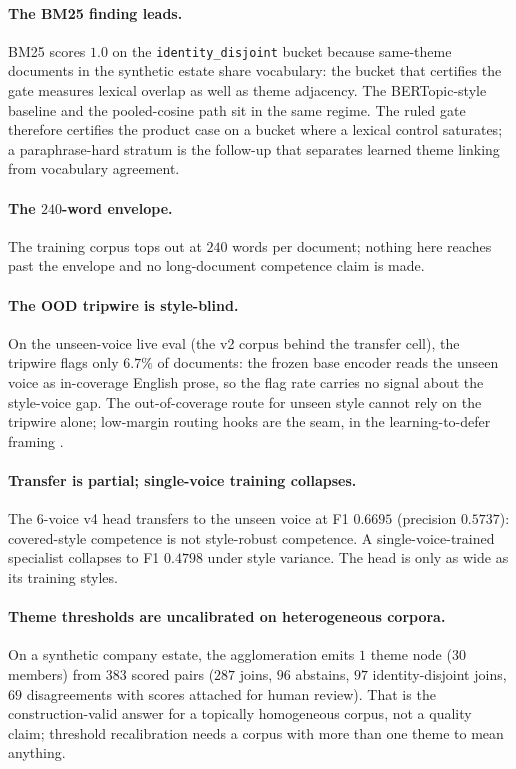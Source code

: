 \documentclass{article}
\begin{document}
\paragraph{The BM25 finding leads.}
BM25 scores $1.0$ on the \texttt{identity\_disjoint} bucket because same-theme documents in the synthetic estate share vocabulary: the bucket that certifies the gate measures lexical overlap as well as theme adjacency. The BERTopic-style baseline and the pooled-cosine path sit in the same regime. The ruled gate therefore certifies the product case on a bucket where a lexical control saturates; a paraphrase-hard stratum is the follow-up that separates learned theme linking from vocabulary agreement.

\paragraph{The $240$-word envelope.}
The training corpus tops out at $240$ words per document; nothing here reaches past the envelope and no long-document competence claim is made.

\paragraph{The OOD tripwire is style-blind.}
On the unseen-voice live eval (the v2 corpus behind the transfer cell), the tripwire flags only $6.7\%$ of documents: the frozen base encoder reads the unseen voice as in-coverage English prose, so the flag rate carries no signal about the style-voice gap. The out-of-coverage route for unseen style cannot rely on the tripwire alone; low-margin routing hooks are the seam, in the learning-to-defer framing \citep{mozannar2020defer}.

\paragraph{Transfer is partial; single-voice training collapses.}
The $6$-voice v4 head transfers to the unseen voice at F1 $0.6695$ (precision $0.5737$): covered-style competence is not style-robust competence. A single-voice-trained specialist collapses to F1 $0.4798$ under style variance. The head is only as wide as its training styles.

\paragraph{Theme thresholds are uncalibrated on heterogeneous corpora.}
On a synthetic company estate, the agglomeration emits $1$ theme node ($30$ members) from $383$ scored pairs ($287$ joins, $96$ abstains, $97$ identity-disjoint joins, $69$ disagreements with scores attached for human review). That is the construction-valid answer for a topically homogeneous corpus, not a quality claim; threshold recalibration needs a corpus with more than one theme to mean anything.
\end{document}
